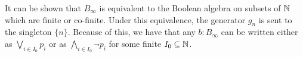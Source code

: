 \begin{remark}\label{BinftyTermsWriting}
  It can be shown that $B_\infty$ is equivalent to the Boolean algebra on 
  subsets of $\mathbb{N}$ which are finite or co-finite. 
  Under this equivalence, the generator $g_n$ is sent to the singleton $\{n\}$. 
  Because of this, we have that any $b:B_\infty$ can be written 
  either as $\bigvee_{i\in I_0} p_i$ or as $\bigwedge_{i\in I_0} \neg p_i$ for some finite $I_0\subseteq \mathbb{N}$. 
\end{remark}





